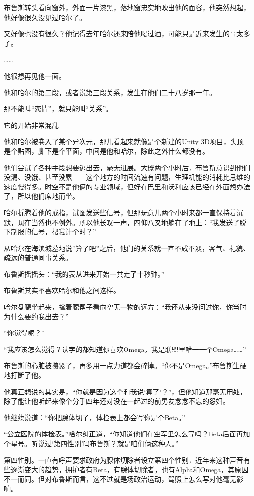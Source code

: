 \documentclass[../main]{subfiles}
\begin{document}
布鲁斯转头看向窗外，外面一片漆黑，落地窗忠实地映出他的面容，他突然想起，他好像很久没见过哈尔了。

又好像也没有很久？他记得去年哈尔还来陪他喝过酒，可能只是近来发生的事太多了。

……

他很想再见他一面。

他和哈尔的第二段，或者说第三段关系，发生在他们二十八岁那一年。

那不能叫“恋情”，就只能叫“关系”。

它的开始非常混乱——

他和哈尔被卷入了某个异次元，那儿看起来就像是个新建的Unity
3D项目，头顶是个贴图，脚下是个平面，中间是他和哈尔，除此之外什么都没有。

他们尝试了各种手段想要逃出去，毫无进展。大概两个小时后，布鲁斯意识到他们没渴、没饿、甚至没累——这个地方的时间流速有问题，生理机能的消耗比思维的速度慢得多。时空不是他俩的专业领域，但好在巴里和沃利应该已经在外面想办法了，所以他们席地而坐。

哈尔折腾着他的戒指，试图发送些信号，但那玩意儿两个小时来都一直保持着沉默，现在当然也不例外。所以他长叹一声，四仰八叉地躺在了地上：“我发送了脱下制服的信号，帮我计个时？”

从哈尔在海滨城墓地说“算了吧”之后，他们的关系就一直不咸不淡，客气、礼貌、疏远的普通同事关系。

布鲁斯摇摇头：“我的表从进来开始一共走了十秒钟。”

布鲁斯其实不喜欢哈尔和他之间这样。

哈尔盘腿坐起来，撑着腮帮子看向空无一物的远方：“我还从来没问过你，你当时为什么要约我出去？”

“你觉得呢？”

“我应该怎么觉得？认字的都知道你喜欢Omega，我是联盟里唯一一个Omega\ldots\ldots”

布鲁斯的心脏被攥紧了，再多用一点力道都会碎掉。“你不是Omega。”布鲁斯生硬地打断了他。

他真正想说的其实是，“你就是因为这个和我说`算了'？”，但他知道那毫无用处，除了能让他听起来像个分手四年还对没在一起过的前男友念念不忘的怨妇。

他继续说道：“你把腺体切了，体检表上都会写你是个Beta。”

“公立医院的体检表。”哈尔纠正道，“你知道他们在空军里怎么写吗？Beta后面再加个星号。听说过`第四性别'吗布鲁斯？就是咱们俩这种人。”

第四性别。一直有呼声要求政府为腺体切除者设立第四个性别，近年来这种声音有些逐渐变大的趋势，拥护者有Beta，有腺体切除者，也有Alpha和Omega，其原因不一而同。但对布鲁斯而言，这不过就是场政治运动，驾照上怎么写对他毫无影响。
\end{document}
